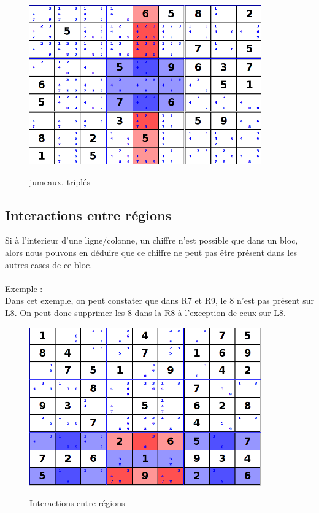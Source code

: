\begin{figure}[ht]
  \caption{\label{annexe3} jumeaux, triplés}
  \includegraphics [width=100mm]{images/PairTriplet.png} \\[0.5cm]
\end{figure}

\newpage

\subsection{Interactions entre régions}
Si à l’interieur d’une ligne/colonne, un chiffre n’est possible que dans un bloc, alors
nous pouvons en déduire que ce chiffre ne peut pas être présent dans les autres cases de
ce bloc.\\
\\

Exemple :\\
Dans cet exemple, on peut constater que dans R7 et R9, le 8 n'est pas présent sur L8. 
On peut donc supprimer les 8 dans la R8 à l'exception de ceux sur L8.

\begin{figure}[ht]
  \caption{\label{annexe4} Interactions entre régions}
  \includegraphics [width=100mm]{images/InteractionBetweenSector.png} \\[0.5cm]
\end{figure}

